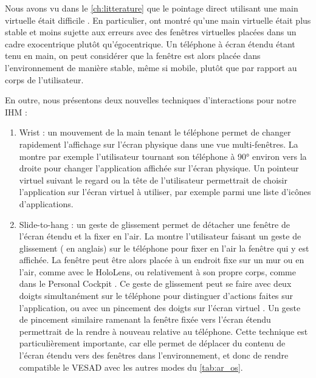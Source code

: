 Nous avons vu dans le \autoref{ch:litterature} que le pointage direct utilisant une main virtuelle était difficile \citep{Chan2010, Argelaguet2013}. En particulier, \cite{Ens2014} ont montré qu'une main virtuelle était plus stable et moins sujette aux erreurs avec des fenêtres virtuelles placées dans un cadre exocentrique plutôt qu'égocentrique. Un téléphone à écran étendu étant tenu en main, on peut considérer que la fenêtre est alors placée dans l'environnement de manière stable, même si mobile, plutôt que par rapport au corps de l'utilisateur.


En outre, nous présentons deux nouvelles techniques d'interactions pour notre IHM :
\begin{enumerate}
  \item Wrist : un mouvement de la main tenant le téléphone permet de changer rapidement l'affichage sur l'écran physique dans une vue multi-fenêtres. La  montre par exemple l'utilisateur tournant son téléphone à \ang{90} environ vers la droite pour changer l'application affichée sur l'écran physique. Un pointeur virtuel suivant le regard ou la tête de l'utilisateur permettrait de choisir l'application sur l'écran virtuel à utiliser, par exemple parmi une liste d'icônes d'applications.
  \item Slide-to-hang : un geste de glissement permet de détacher une fenêtre de l'écran étendu et la fixer en l'air. La  montre l'utilisateur faisant un geste de glissement ( en anglais) sur le téléphone pour fixer en l'air la fenêtre qui y est affichée. La fenêtre peut être alors placée à un endroit fixe sur un mur ou en l'air, comme avec le HoloLens, ou relativement à son propre corps, comme dans le Personal Cockpit \cite{Ens2014}. Ce geste de glissement peut se faire avec deux doigts simultanément sur le téléphone pour distinguer d'actions faites sur l'application, ou avec un pincement des doigts sur l'écran virtuel \cite{Piumsomboon2014}. Un geste de pincement similaire ramenant la fenêtre fixée vers l'écran étendu permettrait de la rendre à nouveau relative au téléphone. Cette technique est particulièrement importante, car elle permet de déplacer du contenu de l'écran étendu vers des fenêtres dans l'environnement, et donc de rendre compatible le VESAD avec les autres modes du \autoref{tab:ar_os}.
\end{enumerate}